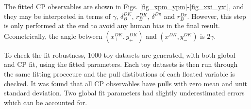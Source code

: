 \documentclass[12pt, a4paper, notitlepage, onecolumn]{article}
\numberwithin{equation}{section}
\begin{document}
The fitted CP observables are shown in Figs. \ref{fig_xpm_ypm}-\ref{fig_xxi_yxi}, and they may be interpreted in terms of $\gamma$, $\delta_B^{DK}$, $r_B^{DK}$, $\delta^{D\pi}$ and $r_B^{D\pi}$. However, this step is only performed at the end to avoid any human bias in the final result. Geometrically, the angle between $(x_+^{DK}, y_+^{DK})$ and $(x_-^{DK}, y_-^{DK})$ is $2\gamma$.

To check the fit robustness, $1000$ toy datasets are generated, with both global and CP fit, using the fitted parameters. Each toy datasets is then run through the same fitting procecure and the pull distibutions of each floated variable is checked. It was found that all CP observables have pulls with zero mean and unit standard deviation. Two global fit parameters had slightly underestimated errors which can be accounted for.
\end{document}
